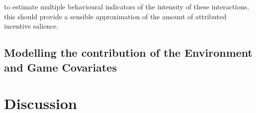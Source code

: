 to estimate multiple behavioural indicators of the intensity of these interactions, this should provide a sensible approximation of the amount of attributed incentive salience. 


\subsection{Modelling the contribution of the Environment and Game Covariates}
\label{modelling_env_and_game_elements}
\lorem


\section{Discussion}
\lorem
